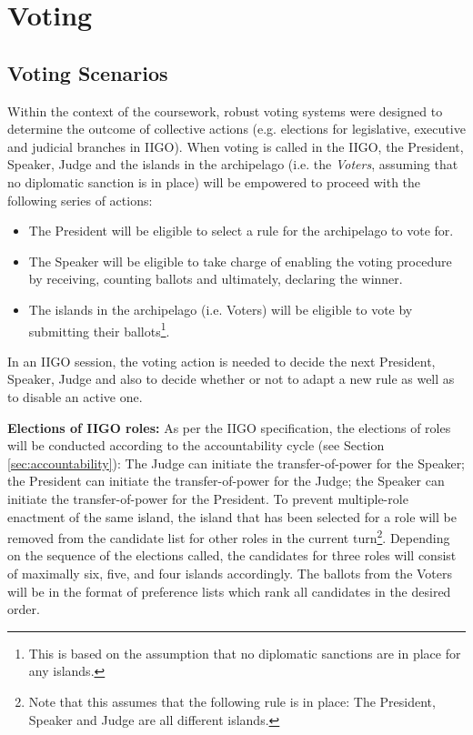 \chapter{Voting}
\section{Voting Scenarios}
\label{sec:VotingScenarios}

Within the context of the coursework, robust voting systems were designed to determine the outcome of collective actions (e.g. elections for legislative, executive and judicial branches in IIGO).
When voting is called in the IIGO, the President, Speaker, Judge and the islands in the archipelago (i.e. the \emph{Voters}, assuming that no diplomatic sanction is in place) will be empowered to proceed with the following series of actions:
\begin{itemize}
    \item The President will be eligible to select a rule for the archipelago to vote for.
    \item The Speaker will be eligible to take charge of enabling the voting procedure by receiving, counting ballots and ultimately, declaring the winner.
    \item The islands in the archipelago (i.e. Voters) will be eligible to vote by submitting their ballots\footnote{This is based on the assumption that no diplomatic sanctions are in place for any islands.}.
\end{itemize}

In an IIGO session, the voting action is needed to decide the next President, Speaker, Judge and also to decide whether or not to adapt a new rule as well as to disable an active one.

\textbf{Elections of IIGO roles:} As per the IIGO specification, the elections of roles will be conducted according to the accountability cycle (see Section \ref{sec:accountability}): The Judge can initiate the transfer-of-power for the Speaker; the President can initiate the transfer-of-power for the Judge; the Speaker can initiate the transfer-of-power for the President. To prevent multiple-role enactment of the same island, the island that has been selected for a role will be removed from the candidate list for other roles in the current turn\footnote{Note that this assumes that the following rule is in place: The President, Speaker and Judge are all different islands.}. Depending on the sequence of the elections called, the candidates for three roles will consist of maximally six, five, and four islands accordingly. The ballots from the Voters will be in the format of preference lists which rank all candidates in the desired order.

